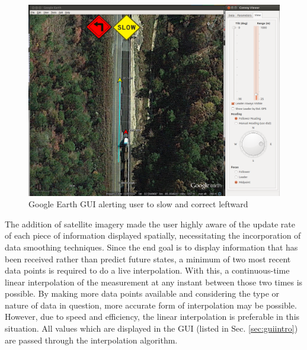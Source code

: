 \documentclass[twocolumn,10pt]{article}
\begin{document}
  \begin{figure}[ht] \centering
    \includegraphics[width=\columnwidth] {../graphics/earth_slow.png}
    \caption{Google Earth GUI alerting user to slow and correct leftward} \label{fig:earth_alerts}
  \end{figure}



  The addition of satellite imagery made the user highly aware of the update rate of each piece of information displayed spatially, necessitating the incorporation of data smoothing techniques. Since the end goal is to display information that has been received rather than predict future states, a minimum of two most recent data points is required to do a live interpolation. With this, a continuous-time linear interpolation of the measurement at any instant between those two times is possible. By making more data points available and considering the type or nature of data in question, more accurate form of interpolation may be possible. However, due to speed and efficiency, the linear interpolation is preferable in this situation. All values which are displayed in the GUI (listed in Sec. \ref{sec:guiintro}) are passed through the interpolation algorithm.
\end{document}
